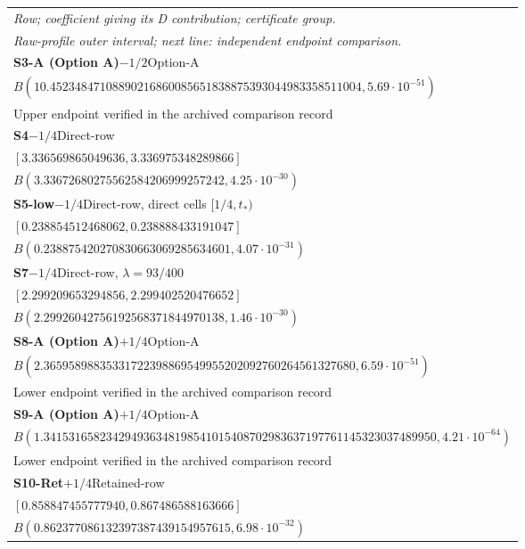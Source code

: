 {{
\normalsize
\renewcommand{\arraystretch}{1.14}
\begin{longtable}{@{}p{\textwidth}@{}}
\toprule
\emph{Row; coefficient giving its D contribution; certificate group.} \\
\emph{Raw-profile outer interval; next line: independent endpoint comparison.} \\
\midrule
\textbf{S3-A (Option A)}\quad $-1/2$\quad Option-A \\
$B(10.45234847108890216860085651838875393044983358511004,5.69\cdot10^{-51})$ \\
Upper endpoint verified in the archived comparison record \\
\midrule
\textbf{S4}\quad $-1/4$\quad Direct-row \\
$[3.336569865049636,3.336975348289866]$ \\
$B(3.33672680275562584206999257242,4.25\cdot10^{-30})$ \\
\midrule
\textbf{S5-low}\quad $-1/4$\quad Direct-row, direct cells $[1/4,t_*)$ \\
$[0.238854512468062,0.238888433191047]$ \\
$B(0.238875420270830663069285634601,4.07\cdot10^{-31})$ \\
\midrule
\textbf{S7}\quad $-1/4$\quad Direct-row, $\lambda=93/400$ \\
$[2.299209653294856,2.299402520476652]$ \\
$B(2.29926042756192568371844970138,1.46\cdot10^{-30})$ \\
\midrule
\textbf{S8-A (Option A)}\quad $+1/4$\quad Option-A \\
$B(2.36595898835331722398869549955202092760264561327680,6.59\cdot10^{-51})$ \\
Lower endpoint verified in the archived comparison record \\
\midrule
\textbf{S9-A (Option A)}\quad $+1/4$\quad Option-A \\
$B(1.341531658234294936348198541015408702983637197761145323037489950,4.21\cdot10^{-64})$ \\
Lower endpoint verified in the archived comparison record \\
\midrule
\textbf{S10-Ret}\quad $+1/4$\quad Retained-row \\
$[0.858847455777940,0.867486588163666]$ \\
$B(0.862377086132397387439154957615,6.98\cdot10^{-32})$ \\
\bottomrule
\end{longtable}
}

}
